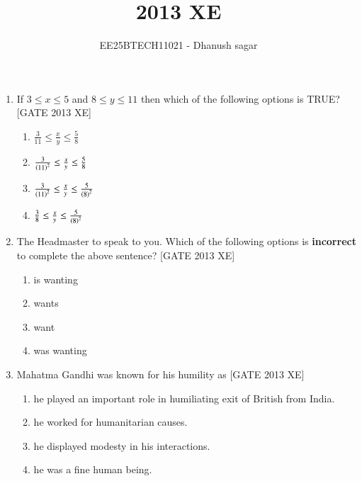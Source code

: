 \documentclass[journal,12pt,onecolumn]{IEEEtran}
\theoremstyle{remark}
\begin{document}
\title{2013 XE}
\author{EE25BTECH11021 - Dhanush sagar}
\maketitle
\renewcommand{\thefigure}{\theenumi}
\renewcommand{\thetable}{\theenumi}

\begin{enumerate}

    \item If $3 \le x \le 5$ and $8 \le y \le 11$ then which of the following options is TRUE? \hfill[GATE 2013 XE]
    \begin{multicols}{2}
    \begin{enumerate}
        \item $\frac{3}{11} \le \frac{x}{y} \le \frac{5}{8}$
        \item $\frac{3}{\left(11\right)^2} \le \frac{x}{y} \le \frac{5}{8}$
        \item $\frac{3}{\left(11\right)^2} \le \frac{x}{y} \le \frac{5}{\left(8\right)^2}$
        \item $\frac{3}{8} \le \frac{x}{y} \le \frac{5}{\left(8\right)^2}$
    \end{enumerate}
    \end{multicols}

    \item The Headmaster \underline{\hspace{1.5cm}} to speak to you.  
    Which of the following options is \textbf{incorrect} to complete the above sentence? \hfill[GATE 2013 XE]
    \begin{multicols}{2}
    \begin{enumerate}
        \item is wanting
        \item wants
        \item want
        \item was wanting
    \end{enumerate}
    \end{multicols}

    \item Mahatma Gandhi was known for his humility as \hfill[GATE 2013 XE]
    \begin{multicols}{2}
    \begin{enumerate}
        \item he played an important role in humiliating exit of British from India.
        \item he worked for humanitarian causes.
        \item he displayed modesty in his interactions.
        \item he was a fine human being.
    \end{enumerate}
    \end{multicols}


\end{enumerate}
\end{document}
